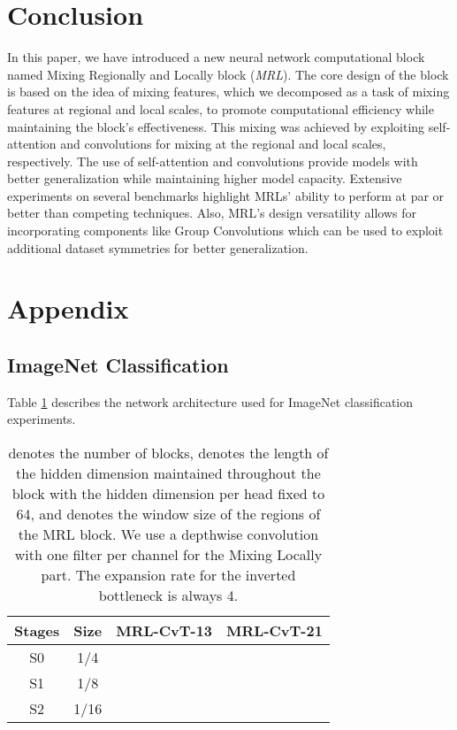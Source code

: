 \documentclass{article}
\begin{document}
\section{Conclusion}

In this paper, we have introduced a new neural network computational block named Mixing Regionally and Locally block (\textit{MRL}). The core design of the block is based on the idea of mixing features, which we decomposed as a task of mixing features at regional and local scales, to promote computational efficiency while maintaining the block's effectiveness. This mixing was achieved by exploiting self-attention and convolutions for mixing at the regional and local scales, respectively. The use of self-attention and convolutions provide models with better generalization while maintaining higher model capacity. Extensive experiments on several benchmarks highlight MRLs' ability to perform at par or better than competing techniques. Also, MRL's design versatility allows for incorporating components like Group Convolutions which can be used to exploit additional dataset symmetries for better generalization. 

























\appendix

\section{Appendix}

\subsection{ImageNet Classification}\label{Appen:IC}

Table \ref{table:cvtmodel} describes the network architecture used for ImageNet classification experiments. 
\begin{table}[htbp] 
  \centering
  \caption{ denotes the number of blocks,  denotes the length of the hidden dimension maintained throughout the block with the hidden dimension per head fixed to 64, and  denotes the window size of the regions of the MRL block. We use a depthwise convolution with one filter per channel for the Mixing Locally part. The expansion rate for the inverted bottleneck is always 4.} \label{table:cvtmodel}
\begin{tabular}{c|c|c|c}
    \toprule
    Stages & Size  & MRL-CvT-13 & MRL-CvT-21 \\
    \midrule
    S0    & 1/4   &  &   \\
    \midrule
    S1    & 1/8   &  &  \\
    \midrule
    S2    & 1/16  &  &  \\
    \end{tabular}\end{table}
\end{document}
